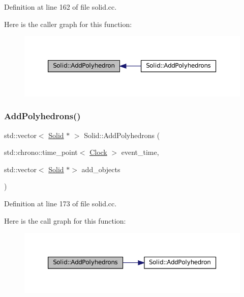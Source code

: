 Definition at line 162 of file solid.\+cc.

Here is the caller graph for this function\+:\nopagebreak
\begin{figure}[H]
\begin{center}
\leavevmode
\includegraphics[width=350pt]{class_solid_a87a3b588f931ff20f09a5d46f6cb7907_icgraph}
\end{center}
\end{figure}
\mbox{\label{class_solid_a649ba1103a9889bc9e45256633dc72c3}} 
\subsubsection{\texorpdfstring{Add\+Polyhedrons()}{AddPolyhedrons()}}
{\footnotesize\ttfamily std\+::vector$<$ \mbox{\hyperlink{class_solid}{Solid}} $\ast$ $>$ Solid\+::\+Add\+Polyhedrons (\begin{DoxyParamCaption}\item[{std\+::chrono\+::time\+\_\+point$<$ \mbox{\hyperlink{universe_8h_a0ef8d951d1ca5ab3cfaf7ab4c7a6fd80}{Clock}} $>$}]{event\+\_\+time,  }\item[{std\+::vector$<$ \mbox{\hyperlink{class_solid}{Solid}} $\ast$$>$}]{add\+\_\+objects }\end{DoxyParamCaption})}



Definition at line 173 of file solid.\+cc.

Here is the call graph for this function\+:\nopagebreak
\begin{figure}[H]
\begin{center}
\leavevmode
\includegraphics[width=350pt]{class_solid_a649ba1103a9889bc9e45256633dc72c3_cgraph}
\end{center}
\end{figure}
\mbox{\label{class_solid_ab546d607d6f0bf70dc5e6bbac8baf287}} 
